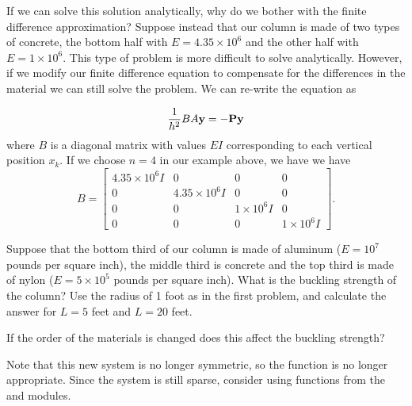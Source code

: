 If we can solve this solution analytically, why do we bother with the finite difference approximation? Suppose instead that our column is made of two types of concrete, the bottom half with $E = 4.35\times 10^6$ and the other half with $E = 1 \times 10^6$. This type of problem is more difficult to solve analytically. However, if we modify our finite difference equation to compensate for the differences in the material we can still solve the problem. We can re-write the equation as

\[
\frac{1}{h^2}B A \bf{y} = -P\bf{y}
\]
where $B$ is a diagonal matrix with values $EI$ corresponding to each vertical position $x_k$. 
If we choose $n=4$ in our example above, we have
we have
$$
B = 
\begin{bmatrix}
4.35\times 10^6I & 0 & 0 & 0\\
0 & 4.35\times 10^6I & 0 & 0\\
0 & 0 & 1 \times 10^6I & 0 \\
0 & 0 & 0 & 1 \times 10^6I
\end{bmatrix}.
$$


\begin{problem}
Suppose that the bottom third of our column is made of aluminum ($E = 10^7$ pounds per square inch), 
the middle third is concrete and the top third is made of nylon ($E = 5\times 10^5$ pounds per square inch). What is the buckling strength of the column?
Use the radius of 1 foot as in the first problem, and calculate the answer for $L = 5$ feet and $L = 20$
feet. 
 
If the order of the materials is changed does this affect the buckling strength?

Note that this new system is no longer symmetric, so the function  is no longer
appropriate. Since the system is still sparse, consider using functions from the 
and  modules.
\end{problem}



